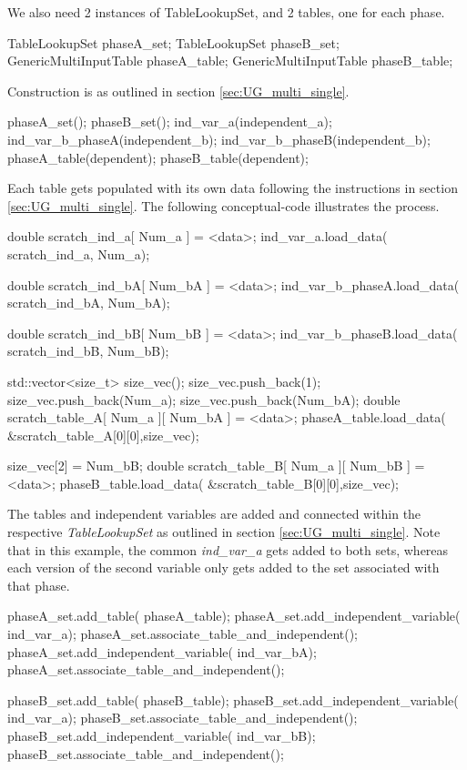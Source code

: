 \documentclass[11pt,fleqn]{report}
\begin{document}
We also need 2 instances of TableLookupSet, and 2 tables, one for each phase.
\begin{code}
TableLookupSet             phaseA_set;
TableLookupSet             phaseB_set;
GenericMultiInputTable     phaseA_table;
GenericMultiInputTable     phaseB_table;
\end{code}

Construction is as outlined in section \ref{sec:UG_multi_single}.
\begin{code}
phaseA_set();
phaseB_set();
ind_var_a(independent_a);
ind_var_b_phaseA(independent_b);
ind_var_b_phaseB(independent_b);
phaseA_table(dependent);
phaseB_table(dependent);
\end{code}

Each table gets populated with its own data following the instructions
in section \ref{sec:UG_multi_single}.  The following conceptual-code
illustrates the process.
\begin{code}
double scratch_ind_a[ Num_a ] = {<data>};
ind_var_a.load_data( scratch_ind_a, Num_a);

double scratch_ind_bA[ Num_bA ] = {<data>};
ind_var_b_phaseA.load_data( scratch_ind_bA, Num_bA);

double scratch_ind_bB[ Num_bB ] = {<data>};
ind_var_b_phaseB.load_data( scratch_ind_bB, Num_bB);

std::vector<size_t> size_vec();
size_vec.push_back(1);
size_vec.push_back(Num_a);
size_vec.push_back(Num_bA);
double scratch_table_A[ Num_a ][ Num_bA ] = {{<data>}};
phaseA_table.load_data( &scratch_table_A[0][0],size_vec);

size_vec[2] = Num_bB;
double scratch_table_B[ Num_a ][ Num_bB ] = {{<data>}};
phaseB_table.load_data( &scratch_table_B[0][0],size_vec);
\end{code}

The tables and independent variables are added and connected within
the respective
\textit{TableLookupSet} as outlined in section \ref{sec:UG_multi_single}.
Note that in this example, the common \textit{ind\_var\_a} gets added to both
sets, whereas each version of the second variable only gets added to the set
associated with that phase.
\begin{code}
phaseA_set.add_table( phaseA_table);
phaseA_set.add_independent_variable( ind_var_a);
phaseA_set.associate_table_and_independent();
phaseA_set.add_independent_variable( ind_var_bA);
phaseA_set.associate_table_and_independent();

phaseB_set.add_table( phaseB_table);
phaseB_set.add_independent_variable( ind_var_a);
phaseB_set.associate_table_and_independent();
phaseB_set.add_independent_variable( ind_var_bB);
phaseB_set.associate_table_and_independent();
\end{code}
\end{document}
